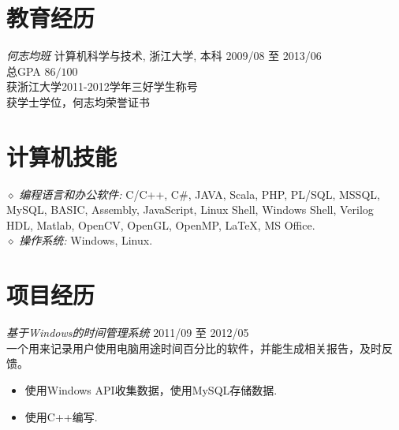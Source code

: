 \documentclass[line,margin]{res}
\begin{document}
\address{联系电话:\sl 15216861267}
\address{E-mail:\sl TaoYeuanWang@gmail.com}


\begin{resume}



\section{教育经历} {\sl 何志均班} 计算机科学与技术, 浙江大学, 本科 \hfill 2009/08 至 2013/06\\
                总GPA $86/100$\\
                获浙江大学2011-2012学年三好学生称号\\
                获学士学位，何志均荣誉证书\\

\section{计算机技能} {$\diamond$ \sl 编程语言和办公软件:} C/C++, C\#, JAVA, Scala, PHP, PL/SQL, MSSQL, MySQL, BASIC, Assembly, JavaScript, Linux Shell, Windows Shell, Verilog HDL, Matlab, OpenCV, OpenGL, OpenMP, \LaTeX, MS Office. \\
                {$\diamond$ \sl 操作系统:} Windows, Linux.

\section{项目经历} {\sl 基于Windows的时间管理系统} \hfill 2011/09 至 2012/05 \\
                一个用来记录用户使用电脑用途时间百分比的软件，并能生成相关报告，及时反馈。
                 \begin{itemize}  \itemsep -2pt %
                 \item 使用Windows API收集数据，使用MySQL存储数据.
                 \item 使用C++编写.
                 \end{itemize}


\end{resume}
\end{document}

